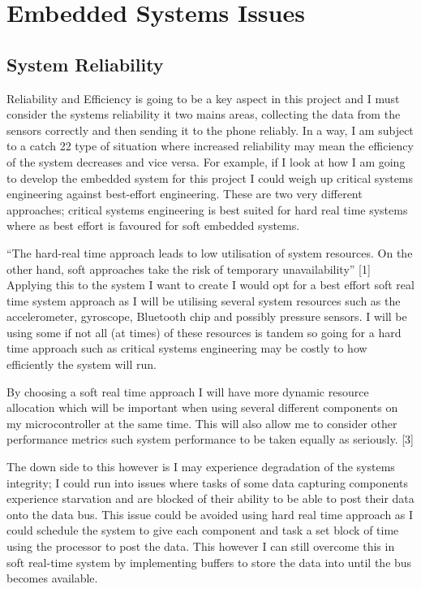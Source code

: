 \section{Embedded Systems Issues}\label{analysis:embeddedsystems}
\subsection{System Reliability}\label{analysis:esreliability}
Reliability and Efficiency is going to be a key aspect in this project and I must consider the systems reliability it two mains areas, collecting the data from the sensors correctly and then sending it to the phone reliably. In a way, I am subject to a catch 22 type of situation where increased reliability may mean the efficiency of the system decreases and vice versa. For example, if I look at how I am going to develop the embedded system for this project I could weigh up critical systems engineering against best-effort engineering. These are two very different approaches; critical systems engineering is best suited for hard real time systems where as best effort is favoured for soft embedded systems.

“The hard-real time approach leads to low utilisation of system resources. On the other hand, soft approaches take the risk of temporary unavailability” [1] Applying this to the system I want to create I would opt for a best effort soft real time system approach as I will be utilising several system resources such as the accelerometer, gyroscope, Bluetooth chip and possibly pressure sensors. I will be using some if not all (at times) of these resources is tandem so going for a hard time approach such as critical systems engineering may be costly to how efficiently the system will run.

By choosing a soft real time approach I will have more dynamic resource allocation which will be important when using several different components on my microcontroller at the same time. This will also allow me to consider other performance metrics such system performance to be taken equally as seriously. [3]

The down side to this however is I may experience degradation of the systems integrity; I could run into issues where tasks of some data capturing components experience starvation and are blocked of their ability to be able to post their data onto the data bus. This issue could be avoided using hard real time approach as I could schedule the system to give each component and task a set block of time using the processor to post the data. This however I can still overcome this in soft real-time system by implementing buffers to store the data into until the bus becomes available. 

